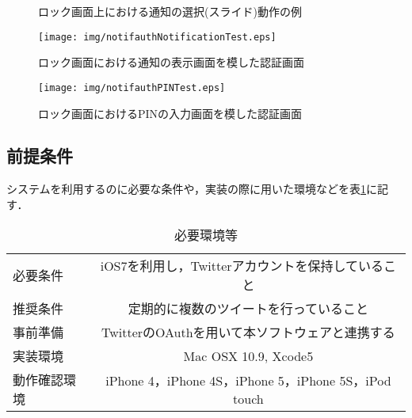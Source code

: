 \begin{figure}[ht]
  \begin{center}
  \end{center}
  \caption{ロック画面上における通知の選択(スライド)動作の例}
  \label{fig:notificationSliding}
\end{figure}

\begin{figure}[ht]
  \begin{minipage}{0.5\hsize}
    \begin{center}
      \texttt{[image: img/notifauthNotificationTest.eps]}
    \end{center}
    \caption{ロック画面における通知の表示画面を模した認証画面}
    \label{fig:notifauthNotificationTest}
  \end{minipage}
  \begin{minipage}{0.5\hsize}
    \begin{center}
      \texttt{[image: img/notifauthPINTest.eps]}
    \end{center}
    \caption{ロック画面におけるPINの入力画面を模した認証画面}
    \label{fig:notifauthPINTest}
  \end{minipage}
\end{figure}

\subsection{前提条件}
システムを利用するのに必要な条件や，実装の際に用いた環境などを表\ref{tbl:requirements}に記す．

\begin{table}[htpb]
  \begin{center}
    \caption{必要環境等}
    \label{tbl:requirements}
    \vspace{4mm}
    \begin{tabular}{|l||c|}
    \hline
    必要条件 & iOS7を利用し，Twitterアカウントを保持していること \\
    推奨条件 & 定期的に複数のツイートを行っていること \\
    事前準備 & TwitterのOAuthを用いて本ソフトウェアと連携する \\
    実装環境 & Mac OSX 10.9, Xcode5 \\
    動作確認環境 & iPhone 4，iPhone 4S，iPhone 5，iPhone 5S，iPod touch \\
    \hline
    \end{tabular}
  \end{center}
\end{table}

